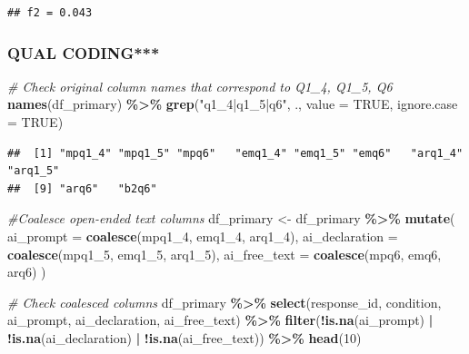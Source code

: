 \documentclass[
]{article}
\newenvironment{Shaded}{\begin{snugshade}}{\end{snugshade}}
\newcommand{\AttributeTok}[1]{\textcolor[rgb]{0.13,0.29,0.53}{#1}}
\newcommand{\CommentTok}[1]{\textcolor[rgb]{0.56,0.35,0.01}{\textit{#1}}}
\newcommand{\ConstantTok}[1]{\textcolor[rgb]{0.56,0.35,0.01}{#1}}
\newcommand{\DecValTok}[1]{\textcolor[rgb]{0.00,0.00,0.81}{#1}}
\newcommand{\FunctionTok}[1]{\textcolor[rgb]{0.13,0.29,0.53}{\textbf{#1}}}
\newcommand{\NormalTok}[1]{#1}
\newcommand{\OtherTok}[1]{\textcolor[rgb]{0.56,0.35,0.01}{#1}}
\newcommand{\SpecialCharTok}[1]{\textcolor[rgb]{0.81,0.36,0.00}{\textbf{#1}}}
\newcommand{\StringTok}[1]{\textcolor[rgb]{0.31,0.60,0.02}{#1}}
\begin{document}
\begin{verbatim}
## f2 = 0.043
\end{verbatim}

\subsubsection{QUAL CODING***}\label{qual-coding}

\begin{Shaded}
\begin{Highlighting}[]
\CommentTok{\# Check original column names that correspond to Q1\_4, Q1\_5, Q6}
\FunctionTok{names}\NormalTok{(df\_primary) }\SpecialCharTok{\%\textgreater{}\%} \FunctionTok{grep}\NormalTok{(}\StringTok{"q1\_4|q1\_5|q6"}\NormalTok{, ., }\AttributeTok{value =} \ConstantTok{TRUE}\NormalTok{, }\AttributeTok{ignore.case =} \ConstantTok{TRUE}\NormalTok{)}
\end{Highlighting}
\end{Shaded}

\begin{verbatim}
##  [1] "mpq1_4" "mpq1_5" "mpq6"   "emq1_4" "emq1_5" "emq6"   "arq1_4" "arq1_5"
##  [9] "arq6"   "b2q6"
\end{verbatim}

\begin{Shaded}
\begin{Highlighting}[]
\CommentTok{\#Coalesce open{-}ended text columns}
\NormalTok{df\_primary }\OtherTok{\textless{}{-}}\NormalTok{ df\_primary }\SpecialCharTok{\%\textgreater{}\%}
  \FunctionTok{mutate}\NormalTok{(}
    \AttributeTok{ai\_prompt      =} \FunctionTok{coalesce}\NormalTok{(mpq1\_4, emq1\_4, arq1\_4),}
    \AttributeTok{ai\_declaration =} \FunctionTok{coalesce}\NormalTok{(mpq1\_5, emq1\_5, arq1\_5),}
    \AttributeTok{ai\_free\_text   =} \FunctionTok{coalesce}\NormalTok{(mpq6, emq6, arq6)}
\NormalTok{  )}

\CommentTok{\# Check coalesced columns}
\NormalTok{df\_primary }\SpecialCharTok{\%\textgreater{}\%}
  \FunctionTok{select}\NormalTok{(response\_id, condition, ai\_prompt, ai\_declaration, ai\_free\_text) }\SpecialCharTok{\%\textgreater{}\%}
  \FunctionTok{filter}\NormalTok{(}\SpecialCharTok{!}\FunctionTok{is.na}\NormalTok{(ai\_prompt) }\SpecialCharTok{|} \SpecialCharTok{!}\FunctionTok{is.na}\NormalTok{(ai\_declaration) }\SpecialCharTok{|} \SpecialCharTok{!}\FunctionTok{is.na}\NormalTok{(ai\_free\_text)) }\SpecialCharTok{\%\textgreater{}\%}
  \FunctionTok{head}\NormalTok{(}\DecValTok{10}\NormalTok{)}
\end{Highlighting}
\end{Shaded}
\end{document}
